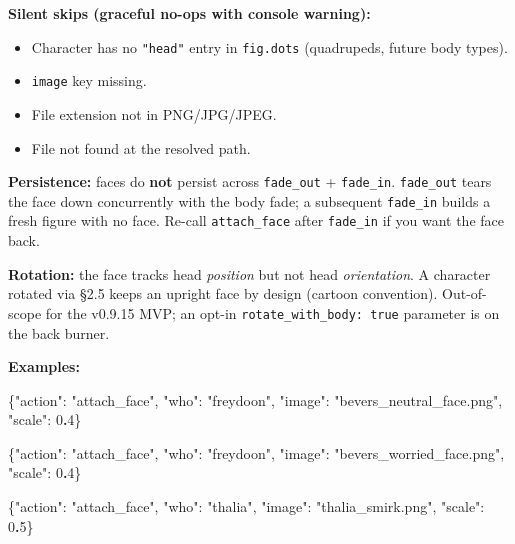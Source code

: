 \documentclass[
  11pt,
]{book}
\newenvironment{Shaded}{}{}
\newcommand{\DataTypeTok}[1]{\textcolor[rgb]{0.56,0.13,0.00}{#1}}
\newcommand{\DecValTok}[1]{\textcolor[rgb]{0.25,0.63,0.44}{#1}}
\newcommand{\ErrorTok}[1]{\textcolor[rgb]{1.00,0.00,0.00}{\textbf{#1}}}
\newcommand{\FunctionTok}[1]{\textcolor[rgb]{0.02,0.16,0.49}{#1}}
\newcommand{\StringTok}[1]{\textcolor[rgb]{0.25,0.44,0.63}{#1}}
\providecommand{\tightlist}{%
  \setlength{\itemsep}{0pt}\setlength{\parskip}{0pt}}
\begin{document}
\textbf{Silent skips (graceful no-ops with console warning):}

\begin{itemize}
\tightlist
\item
  Character has no \texttt{"head"} entry in \texttt{fig.dots}
  (quadrupeds, future body types).
\item
  \texttt{image} key missing.
\item
  File extension not in PNG/JPG/JPEG.
\item
  File not found at the resolved path.
\end{itemize}

\textbf{Persistence:} faces do \textbf{not} persist across
\texttt{fade\_out} + \texttt{fade\_in}. \texttt{fade\_out} tears the
face down concurrently with the body fade; a subsequent
\texttt{fade\_in} builds a fresh figure with no face. Re-call
\texttt{attach\_face} after \texttt{fade\_in} if you want the face back.

\textbf{Rotation:} the face tracks head \emph{position} but not head
\emph{orientation}. A character rotated via §2.5 keeps an upright face
by design (cartoon convention). Out-of-scope for the v0.9.15 MVP; an
opt-in \texttt{rotate\_with\_body:\ true} parameter is on the back
burner.

\textbf{Examples:}

\begin{Shaded}
\begin{Highlighting}[]
\FunctionTok{\{}\DataTypeTok{"action"}\FunctionTok{:} \StringTok{"attach\_face"}\FunctionTok{,} \DataTypeTok{"who"}\FunctionTok{:} \StringTok{"freydoon"}\FunctionTok{,}
 \DataTypeTok{"image"}\FunctionTok{:} \StringTok{"bevers\_neutral\_face.png"}\FunctionTok{,} \DataTypeTok{"scale"}\FunctionTok{:} \DecValTok{0}\ErrorTok{.}\DecValTok{4}\FunctionTok{\}}

\FunctionTok{\{}\DataTypeTok{"action"}\FunctionTok{:} \StringTok{"attach\_face"}\FunctionTok{,} \DataTypeTok{"who"}\FunctionTok{:} \StringTok{"freydoon"}\FunctionTok{,}
 \DataTypeTok{"image"}\FunctionTok{:} \StringTok{"bevers\_worried\_face.png"}\FunctionTok{,} \DataTypeTok{"scale"}\FunctionTok{:} \DecValTok{0}\ErrorTok{.}\DecValTok{4}\FunctionTok{\}}

\FunctionTok{\{}\DataTypeTok{"action"}\FunctionTok{:} \StringTok{"attach\_face"}\FunctionTok{,} \DataTypeTok{"who"}\FunctionTok{:} \StringTok{"thalia"}\FunctionTok{,}
 \DataTypeTok{"image"}\FunctionTok{:} \StringTok{"thalia\_smirk.png"}\FunctionTok{,} \DataTypeTok{"scale"}\FunctionTok{:} \DecValTok{0}\ErrorTok{.}\DecValTok{5}\FunctionTok{\}}
\end{Highlighting}
\end{Shaded}
\end{document}
